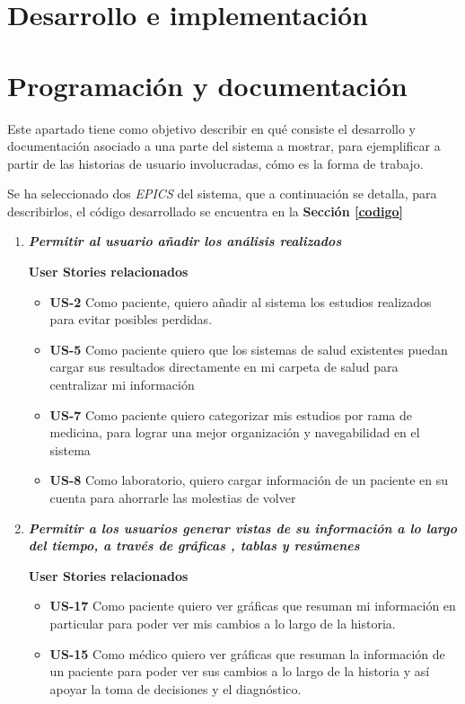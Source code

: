 \section*{Desarrollo e implementación}
\section{Programación y documentación}
Este apartado tiene como objetivo describir en qué consiste el desarrollo y documentación asociado a una parte del sistema a mostrar, para ejemplificar a partir de las historias de usuario involucradas, cómo es la forma de trabajo.
	

Se ha seleccionado dos \textit{EPICS} del sistema, que a continuación se detalla, para describirlos, el código desarrollado se encuentra en la \textbf{Sección \ref{codigo}}
\begin{enumerate}
\item \textit{\textbf{Permitir al usuario añadir los análisis realizados }}

\textbf{User Stories relacionados}
    \begin{itemize}
        \item \textbf{US-2 }Como paciente, quiero añadir al sistema los estudios realizados para evitar posibles perdidas.
        \item \textbf{US-5 }Como paciente quiero que los sistemas de salud existentes puedan cargar sus resultados directamente en mi carpeta de salud para centralizar mi información
        \item  \textbf{US-7} Como paciente quiero categorizar mis estudios por rama de medicina, para lograr una mejor organización y navegabilidad en el sistema
        \item \textbf{US-8} Como laboratorio, quiero cargar información de un paciente en su cuenta para ahorrarle las molestias de volver
    \end{itemize}
\item \textbf{\textit{Permitir a los usuarios generar vistas de su información a lo largo del tiempo, a través de gráficas , tablas y resúmenes }}

\textbf{User Stories relacionados}
    \begin{itemize}
        \item \textbf{US-17} Como paciente quiero ver gráficas que resuman mi información en particular para poder ver mis cambios a lo largo de la historia.
        \item \textbf{US-15} Como médico quiero ver gráficas que resuman la información de un paciente para poder ver sus cambios a lo largo de la historia y así apoyar la toma de decisiones y el diagnóstico.
    \end{itemize}
\end{enumerate}

